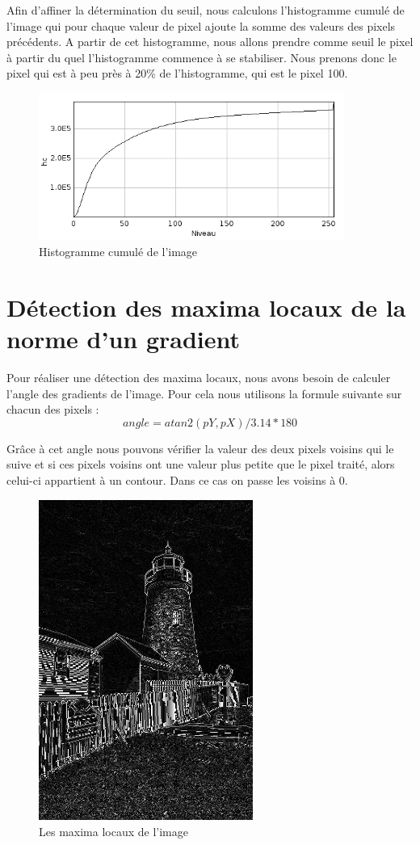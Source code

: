 \documentclass[a4paper,11pt]{article}
\begin{document}
  Afin d'affiner la détermination du seuil, nous calculons l'histogramme cumulé de l'image qui pour chaque valeur 
  de pixel ajoute la somme des valeurs des pixels précédents. A partir de cet histogramme, nous allons prendre comme 
  seuil le pixel à partir du quel l'histogramme commence à se stabiliser. Nous prenons donc le pixel qui est à peu près 
  à 20\% de l'histogramme, qui est le pixel 100.\\
  
  \begin{figure}[H]
  \center
   \includegraphics[width=10cm]{../histoCumul.png}
   \caption{Histogramme cumulé de l'image}
  \end{figure}
  
  \section{Détection des maxima locaux de la norme d'un gradient}
  Pour réaliser une détection des maxima locaux, nous avons besoin de calculer l'angle des gradients
  de l'image. Pour cela nous utilisons la formule suivante sur chacun des pixels :
  $$angle = atan2(pY, pX)/3.14*180$$
  
  Grâce à cet angle nous pouvons vérifier la valeur des deux pixels voisins qui le suive et si ces pixels
  voisins ont une valeur plus petite que le pixel traité, alors celui-ci appartient à un contour.
  Dans ce cas on passe les voisins à 0.\\
  
  \begin{figure}[H]
  \center
   \includegraphics[width=7cm]{../maxima_locaux.png}
   \caption{Les maxima locaux de l'image}
  \end{figure}
  
\end{document}
